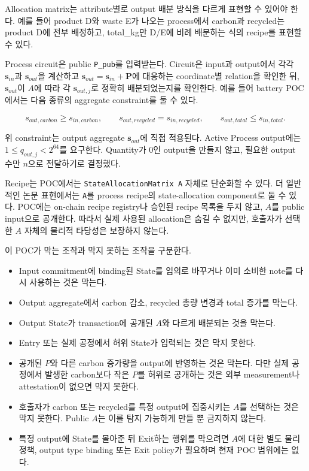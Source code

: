 \documentclass[11pt]{extarticle}
\begin{document}
Allocation matrix는 attribute별로 output 배분 방식을 다르게 표현할 수
있어야 한다. 예를 들어 product D와 waste E가 나오는 process에서 carbon과
recycled는 product D에 전부 배정하고, total\_kg만 D/E에 비례 배분하는
식의 recipe를 표현할 수 있다.

Process circuit은 public \texttt{P\_pub}를 입력받는다. Circuit은 input과 output에서
각각 $\mathbf{s}_{in}$과 $\mathbf{s}_{out}$을 계산하고
$\mathbf{s}_{out}=\mathbf{s}_{in}+\mathbf{P}$에 대응하는 coordinate별 relation을
확인한 뒤, $\mathbf{s}_{out}$이 $A$에 따라 각 $\mathbf{s}_{out,j}$로 정확히
배분되었는지를 확인한다. 예를 들어 battery POC에서는 다음 종류의
aggregate constraint를 둘 수 있다.

\[
s_{out,carbon}\geq s_{in,carbon},
\qquad
s_{out,recycled}=s_{in,recycled},
\qquad
s_{out,total}\leq s_{in,total}.
\]

위 constraint는 output aggregate $\mathbf{s}_{out}$에 직접 적용된다. Active Process
output에는 $1\leq q_{out,j}<2^{64}$를 요구한다. Quantity가 0인 output을 만들지 않고,
필요한 output 수만 $n$으로 전달하기로 결정했다.

Recipe는 POC에서는 \texttt{StateAllocationMatrix\ A} 자체로 단순화할 수
있다. 더 일반적인 논문 표현에서는 \texttt{A}를 process recipe의
state-allocation component로 둘 수 있다. POC에는 on-chain recipe registry나
승인된 recipe 목록을 두지 않고, $A$를 public input으로 공개한다. 따라서 실제 사용된
allocation은 숨길 수 없지만, 호출자가 선택한 $A$ 자체의 물리적 타당성은 보장하지 않는다.

이 POC가 막는 조작과 막지 못하는 조작을 구분한다.

\begin{itemize}
  \item Input commitment에 binding된 State를 임의로 바꾸거나 이미 소비한 note를 다시
  사용하는 것은 막는다.
  \item Output aggregate에서 carbon 감소, recycled 총량 변경과 total 증가를 막는다.
  \item Output State가 transaction에 공개된 $A$와 다르게 배분되는 것을 막는다.
  \item Entry 또는 실제 공정에서 허위 State가 입력되는 것은 막지 못한다.
  \item 공개된 $P$와 다른 carbon 증가량을 output에 반영하는 것은 막는다.
  다만 실제 공정에서 발생한 carbon보다 작은 $P$를 허위로 공개하는 것은 외부
  measurement나 attestation이 없으면 막지 못한다.
  \item 호출자가 carbon 또는 recycled를 특정 output에 집중시키는 $A$를 선택하는 것은
  막지 못한다. Public $A$는 이를 탐지 가능하게 만들 뿐 금지하지 않는다.
  \item 특정 output에 State를 몰아준 뒤 Exit하는 행위를 막으려면 $A$에 대한 별도
  물리 정책, output type binding 또는 Exit policy가 필요하며 현재 POC 범위에는 없다.
\end{itemize}
\end{document}
